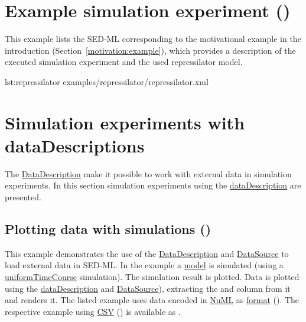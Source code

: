 \section{Example simulation experiment ()}
\label{example:repressilator}
This example lists the SED-ML corresponding to the motivational example in the introduction (Section~\ref{motivation:example}), which provides a description of the executed simulation experiment and the used repressilator model. 

{lst:repressilator}
{examples/repressilator/repressilator.xml}

\pagebreak
\section{Simulation experiments with dataDescriptions}
The \hyperref[class:dataDescription]{DataDescription} make it possible to work with external data in simulation experiments. In this section simulation experiments using the \hyperref[class:dataDescription]{dataDescription} are presented.

\subsection{Plotting data with simulations ()}
This example demonstrates the use of the \hyperref[class:dataDescription]{DataDescription} and \hyperref[class:dataSource]{DataSource} to load external data in SED-ML. In the example a \hyperref[class:model]{model} is simulated (using a \hyperref[class:uniformTimeCourse]{uniformTimeCourse} simulation). The simulation result is plotted. Data is plotted using the \hyperref[class:dataDescription]{dataDescription} and \hyperref[class:dataSource]{DataSource}), extracting the  and  column from it and renders it. The listed example uses data encoded in \hyperref[sec:dataFormatNUML]{NuML} as \hyperref[sec:dataFormatURI]{format} (). The respective example using \hyperref[sec:dataFormatCSV]{CSV} () is available as .

